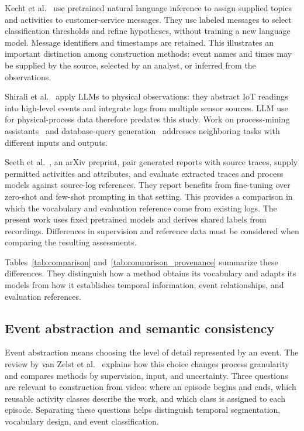 Kecht et al.~\cite{kecht2021conversations} use pretrained natural language inference to assign supplied topics and activities to customer-service messages. They use labeled messages to select classification thresholds and refine hypotheses, without training a new language model. Message identifiers and timestamps are retained. This illustrates an important distinction among construction methods: event names and times may be supplied by the source, selected by an analyst, or inferred from the observations.

Shirali et al.~\cite{shirali2025iot} apply LLMs to physical observations: they abstract IoT readings into high-level events and integrate logs from multiple sensor sources. LLM use for physical-process data therefore predates this study. Work on process-mining assistants~\cite{berti2025benchmark} and database-query generation~\cite{dani2025llm} addresses neighboring tasks with different inputs and outputs.

Seeth et al.~\cite{seeth2026finetuned}, an arXiv preprint, pair generated reports with source traces, supply permitted activities and attributes, and evaluate extracted traces and process models against source-log references. They report benefits from fine-tuning over zero-shot and few-shot prompting in that setting. This provides a comparison in which the vocabulary and evaluation reference come from existing logs. The present work uses fixed pretrained models and derives shared labels from recordings. Differences in supervision and reference data must be considered when comparing the resulting assessments.

Tables~\ref{tab:comparison} and~\ref{tab:comparison_provenance} summarize these differences. They distinguish how a method obtains its vocabulary and adapts its models from how it establishes temporal information, event relationships, and evaluation references.

\subsection{Event abstraction and semantic consistency}
Event abstraction means choosing the level of detail represented by an event. The review by van Zelst et al.~\cite{vanZelst2021abstraction} explains how this choice changes process granularity and compares methods by supervision, input, and uncertainty. Three questions are relevant to construction from video: where an episode begins and ends, which reusable activity classes describe the work, and which class is assigned to each episode. Separating these questions helps distinguish temporal segmentation, vocabulary design, and event classification.

